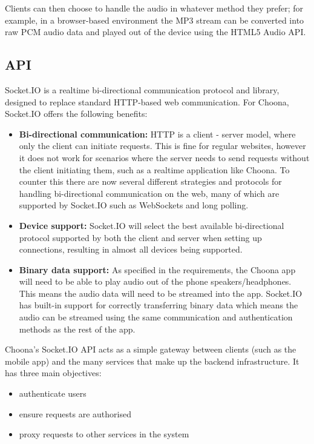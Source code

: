Clients can then choose to handle the audio in whatever method they prefer; for example, in a browser-based environment the MP3 stream can be converted into raw PCM audio data and played out of the device using the HTML5 Audio API.


\subsection{API}

Socket.IO is a realtime bi-directional communication protocol and library, designed to replace standard HTTP-based web communication. For Choona, Socket.IO offers the following benefits:

\begin{itemize}
  \item \textbf{Bi-directional communication:} HTTP is a client -\> server model, where only the client can initiate requests. This is fine for regular websites, however it does not work for scenarios where the server needs to send requests without the client initiating them, such as a realtime application like Choona. To counter this there are now several different strategies and protocols for handling bi-directional communication on the web, many of which are supported by Socket.IO such as WebSockets and long polling.
  \item \textbf{Device support:} Socket.IO will select the best available bi-directional protocol supported by both the client and server when setting up connections, resulting in almost all devices being supported.
  \item \textbf{Binary data support:} As specified in the requirements, the Choona app will need to be able to play audio out of the phone speakers/headphones. This means the audio data will need to be streamed into the app. Socket.IO has built-in support for correctly transferring binary data which means the audio can be streamed using the same communication and authentication methods as the rest of the app.
\end{itemize}

Choona's Socket.IO API acts as a simple gateway between clients (such as the mobile app) and the many services that make up the backend infrastructure. It has three main objectives:

\begin{itemize}
  \item authenticate users
  \item ensure requests are authorised
  \item proxy requests to other services in the system
\end{itemize}

